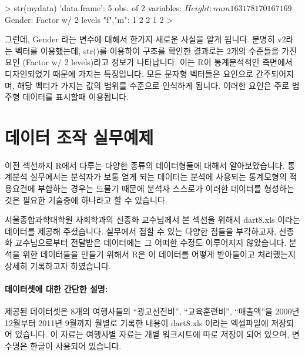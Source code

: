 \documentclass[tutorial.tex]{subfiles}
\begin{document}
\begin{Schunk}
\begin{Soutput}
> str(mydata)
'data.frame':	5 obs. of  2 variables:
 $ Height: num  163 178 170 167 169
 $ Gender: Factor w/ 2 levels "f","m": 1 2 2 1 2
> 
\end{Soutput}
\end{Schunk}

그런데, Gender 라는 변수에 대해서 한가지 새로운 사실을 알게 됩니다. 
분명히 v2라는 벡터를 이용했는데, str()를 이용하여 구조를 확인한 결과로는 2개의 수준들을 가진 요인 (Factor w/ 2 levels)라고 정보가 나타납니다.
이는 R이 통계분석적인 측면에서 디자인되었기 때문에 가지는 특징입니다.
모든 문자형 벡터들은 요인으로 간주되어지며, 해당 벡터가 가지는 값의 범위를 수준으로 인식하게 됩니다.
이러한 요인은 주로 범주형 데이터를 표시할때 이용됩니다.



%
%

\section{데이터 조작 실무예제}

이전 섹션까지 R에서 다루는 다양한 종류의 데이터형들에 대해서 알아보았습니다.
통계분석 실무에서는 분석자가 보통 얻게 되는 데이터는 분석에 사용되는 통계모형의 적용요건에 부합하는 경우는 드물기 때문에 분석자 스스로가 이러한 데이터를 형성하는 것은 필요한 기술중에 하나라고 할 수 있습니다.

서울종합과학대학원 사회학과의 신종화 교수님께서 본 섹션을 위해서 dart8.xls 이라는 데이터를 제공해 주셨습니다. 
실무에서 접할 수 있는 다양한 점들을 부각하고자, 신종화 교수님으로부터 전달받은 데이터에는 그 어떠한 수정도 이루어지지 않았습니다.
분석을 위한 데이터들을 만들기 위해서 R은 이 데이터를 어떻게 받아들이고 처리했는지 상세히 기록하고자 하였습니다.

\paragraph{데이터셋에 대한 간단한 설명:}  
제공된 데이터셋은 8개의 여행사들의 ``광고선전비'', ``교육훈련비'', ``매출액''을 2000년 12월부터 2011년 9월까지 월별로 기록한 내용이 dart8.xls 이라는 엑셀파일에 저장되어 있습니다. 
이 자료는 여행사별 자료는 개별 워크시트에 따로 저장이 되어 있으며, 변수명은 한글이 사용되어 있습니다.
\end{document}
